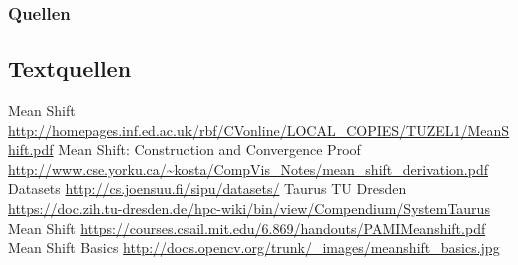 \documentclass[10pt,utf8]{beamer}
\begin{document}
\begin{frame}
\frametitle{Quellen}
\framesubtitle{}
\tiny
\subsection*{Textquellen}
	\begin{itemize}[]
		\bibitem [0] {} Mean Shift \url{http://homepages.inf.ed.ac.uk/rbf/CVonline/LOCAL_COPIES/TUZEL1/MeanShift.pdf}
		\bibitem [1] {} Mean Shift: Construction and Convergence Proof \url{http://www.cse.yorku.ca/~kosta/CompVis_Notes/mean_shift_derivation.pdf}
		\bibitem [2] {} Datasets \url{http://cs.joensuu.fi/sipu/datasets/}
		\bibitem [3] {} Taurus TU Dresden \url{https://doc.zih.tu-dresden.de/hpc-wiki/bin/view/Compendium/SystemTaurus}
		\bibitem [4] {} Mean Shift \url{https://courses.csail.mit.edu/6.869/handouts/PAMIMeanshift.pdf}
		\bibitem [B0] {} Mean Shift Basics \url{http://docs.opencv.org/trunk/_images/meanshift_basics.jpg}
	\end{itemize}
\end{frame}
\end{document}
